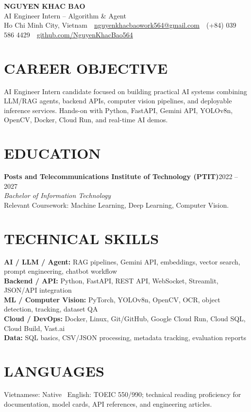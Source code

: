 \documentclass[10pt,a4paper]{article}
\newcommand{\entryhead}[2]{%
    \noindent\textbf{#1}\hfill #2\\[-2pt]
}
\newcommand{\entrysub}[1]{%
    \noindent\textit{#1}\\[-1pt]
}
\begin{document}
\fontsize{9.05}{10.0}\selectfont

\begin{center}
    {\Large\textbf{NGUYEN KHAC BAO}}\\[-1pt]
    AI Engineer Intern -- Algorithm \& Agent\\[2pt]
    Ho Chi Minh City, Vietnam
    \,\textbar\,
    \href{mailto:nguyenkhacbaowork564@gmail.com}{nguyenkhacbaowork564@gmail.com}
    \,\textbar\,
    (+84) 039 586 4429
    \,\textbar\,
    \href{https://github.com/NguyenKhacBao564}{github.com/NguyenKhacBao564}
\end{center}

\section{CAREER OBJECTIVE}
AI Engineer Intern candidate focused on building practical AI systems combining LLM/RAG agents, backend APIs, computer vision pipelines, and deployable inference services. Hands-on with Python, FastAPI, Gemini API, YOLOv8n, OpenCV, Docker, Cloud Run, and real-time AI demos.

\section{EDUCATION}
\entryhead{Posts and Telecommunications Institute of Technology (PTIT)}{2022 -- 2027}
\entrysub{Bachelor of Information Technology}
Relevant Coursework: Machine Learning, Deep Learning, Computer Vision.

\section{TECHNICAL SKILLS}
\textbf{AI / LLM / Agent:} RAG pipelines, Gemini API, embeddings, vector search, prompt engineering, chatbot workflow\\
\textbf{Backend / API:} Python, FastAPI, REST API, WebSocket, Streamlit, JSON/API integration\\
\textbf{ML / Computer Vision:} PyTorch, YOLOv8n, OpenCV, OCR, object detection, tracking, dataset QA\\
\textbf{Cloud / DevOps:} Docker, Linux, Git/GitHub, Google Cloud Run, Cloud SQL, Cloud Build, Vast.ai\\
\textbf{Data:} SQL basics, CSV/JSON processing, metadata tracking, evaluation reports

\section{LANGUAGES}
Vietnamese: Native \textbar\ English: TOEIC 550/990; technical reading proficiency for documentation, model cards, API references, and engineering articles.
\end{document}
